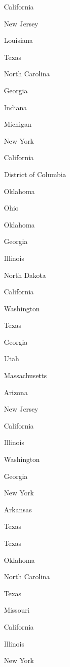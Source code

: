 \documentclass[11pt]{article}
\begin{document}
\begin{enumerate*}
\item California
\item New Jersey
\item Louisiana
\item Texas
\item North Carolina
\item Georgia
\item Indiana
\item Michigan
\item New York
\item California
\item District of Columbia
\item Oklahoma
\item Ohio
\item Oklahoma
\item Georgia
\item Illinois
\item North Dakota
\item California
\item Washington
\item Texas
\item Georgia
\item Utah
\item Massachusetts
\item Arizona
\item New Jersey
\item California
\item Illinois
\item Washington
\item Georgia
\item New York
\item Arkansas
\item Texas
\item Texas
\item Oklahoma
\item North Carolina
\item Texas
\item Missouri
\item California
\item Illinois
\item New York
\end{enumerate*}
\end{document}
